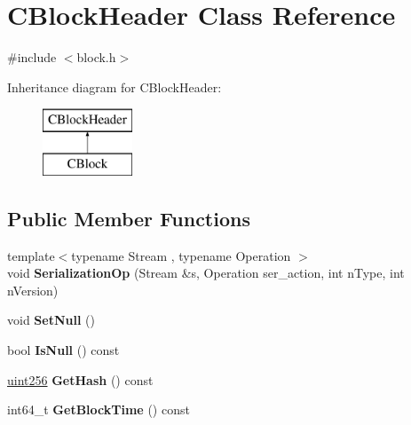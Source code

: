 \hypertarget{class_c_block_header}{}\section{C\+Block\+Header Class Reference}
\label{class_c_block_header}


{\ttfamily \#include $<$block.\+h$>$}

Inheritance diagram for C\+Block\+Header\+:\begin{figure}[H]
\begin{center}
\leavevmode
\includegraphics[height=2.000000cm]{class_c_block_header}
\end{center}
\end{figure}
\subsection*{Public Member Functions}
\begin{DoxyCompactItemize}
\item 
\mbox{\label{class_c_block_header_ae564e96da45702d79c83e3ad0ce19873}} 
{\footnotesize template$<$typename Stream , typename Operation $>$ }\\void {\bfseries Serialization\+Op} (Stream \&s, Operation ser\+\_\+action, int n\+Type, int n\+Version)
\item 
\mbox{\label{class_c_block_header_ae39c04a4357417d98954a51f53beb78a}} 
void {\bfseries Set\+Null} ()
\item 
\mbox{\label{class_c_block_header_afb875dba7ce6e26c01509244e3cd950f}} 
bool {\bfseries Is\+Null} () const
\item 
\mbox{\label{class_c_block_header_af0239f86a13f622a826e9eea66b2d7f3}} 
\mbox{\hyperlink{classuint256}{uint256}} {\bfseries Get\+Hash} () const
\item 
\mbox{\label{class_c_block_header_abad634d81d4c810390fa2080d79633e8}} 
int64\+\_\+t {\bfseries Get\+Block\+Time} () const
\end{DoxyCompactItemize}
